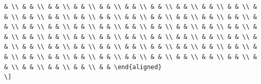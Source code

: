 \documentclass[
]{article}
\begin{document}
\begin{verbatim}
& \\ & & \\ & & \\ & & \\ & & \\ & & \\ & & \\ & & \\ & & \\ & & \\ & & \\ & & \\ & & \\ & & \\ & & \\ & & \\ & & \\ & & \\ & & \\ & & \\ & & \\ & & \\ & & \\ & & \\ & & \\ & & \\ & & \\ & & \\ & & \\ & & \\ & & \\ & & \\ & & \\ & & \\ & & \\ & & \\ & & \\ & & \\ & & \\ & & \\ & & \\ & & \\ & & \\ & & \\ & & \\ & & \\ & & \\ & & \\ & & \\ & & \\ & & \\ & & \\ & & \\ & & \\ & & \\ & & \\ & & \\ & & \\ & & \\ & & \\ & & \\ & & \\ & & \\ & & \\ & & \end{aligned}
\]
\end{verbatim}
\end{document}
